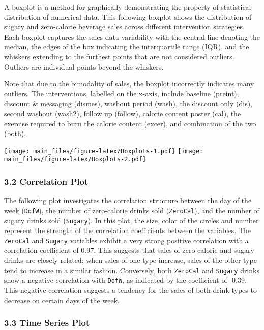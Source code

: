 \documentclass[
]{article}
\begin{document}
A boxplot is a method for graphically demonstrating the property of
statistical distribution of numerical data. This following boxplot shows
the distribution of sugary and zero-calorie beverage sales across
different intervention strategies. Each boxplot captures the sales data
variability with the central line denoting the median, the edges of the
box indicating the interquartile range (IQR), and the whiskers extending
to the furthest points that are not considered outliers. Outliers are
individual points beyond the whiskers.

Note that due to the bimodality of sales, the boxplot incorrectly
indicates many outliers. The interventions, labelled on the x-axis,
include baseline (preint), discount \& messaging (dismes), washout
period (wash), the discount only (dis), second washout (wash2), follow
up (follow), calorie content poster (cal), the exercise required to burn
the calorie content (excer), and combination of the two (both).

\texttt{[image: main\_files/figure-latex/Boxplots-1.pdf]}
\texttt{[image: main\_files/figure-latex/Boxplots-2.pdf]}

\hypertarget{correlation-plot}{%
\subsubsection{3.2 Correlation Plot}\label{correlation-plot}}

The following plot investigates the correlation structure between the
day of the week (\texttt{DofW}), the number of zero-calorie drinks sold
(\texttt{ZeroCal}), and the number of sugary drinks sold
(\texttt{Sugary}). In this plot, the size, color of the circles and
number represent the strength of the correlation coefficients between
the variables. The \texttt{ZeroCal} and \texttt{Sugary} variables
exhibit a very strong positive correlation with a correlation
coefficient of 0.97. This suggests that sales of zero-calorie and sugary
drinks are closely related; when sales of one type increase, sales of
the other type tend to increase in a similar fashion. Conversely, both
\texttt{ZeroCal} and \texttt{Sugary} drinks show a negative correlation
with \texttt{DofW}, as indicated by the coefficient of -0.39. This
negative correlation suggests a tendency for the sales of both drink
types to decrease on certain days of the week.

\hypertarget{time-series-plot}{%
\subsubsection{3.3 Time Series Plot}\label{time-series-plot}}
\end{document}
